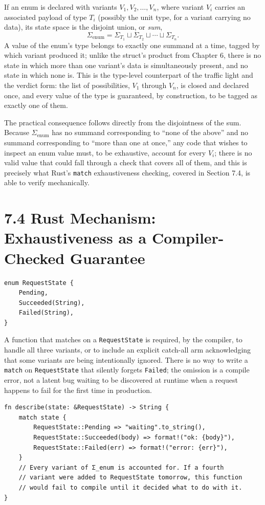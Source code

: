\documentclass[11pt]{book}
\begin{document}
If an enum is declared with variants $V_1, V_2, \ldots, V_n$, where variant $V_i$ carries an associated payload of type $T_i$ (possibly the unit type, for a variant carrying no data), its state space is the disjoint union, or \emph{sum},
\[
\Sigma_{\text{enum}} = \Sigma_{T_1} \sqcup \Sigma_{T_2} \sqcup \cdots \sqcup \Sigma_{T_n}.
\]
A value of the enum's type belongs to exactly one summand at a time, tagged by which variant produced it; unlike the struct's product from Chapter 6, there is no state in which more than one variant's data is simultaneously present, and no state in which none is. This is the type-level counterpart of the traffic light and the verdict form: the list of possibilities, $V_1$ through $V_n$, is closed and declared once, and every value of the type is guaranteed, by construction, to be tagged as exactly one of them.

The practical consequence follows directly from the disjointness of the sum. Because $\Sigma_{\text{enum}}$ has no summand corresponding to ``none of the above'' and no summand corresponding to ``more than one at once,'' any code that wishes to inspect an enum value must, to be exhaustive, account for every $V_i$; there is no valid value that could fall through a check that covers all of them, and this is precisely what Rust's \texttt{match} exhaustiveness checking, covered in Section 7.4, is able to verify mechanically.

\section*{7.4 Rust Mechanism: Exhaustiveness as a Compiler-Checked Guarantee}

\begin{lstlisting}
enum RequestState {
    Pending,
    Succeeded(String),
    Failed(String),
}
\end{lstlisting}

A function that matches on a \texttt{RequestState} is required, by the compiler, to handle all three variants, or to include an explicit catch-all arm acknowledging that some variants are being intentionally ignored. There is no way to write a \texttt{match} on \texttt{RequestState} that silently forgets \texttt{Failed}; the omission is a compile error, not a latent bug waiting to be discovered at runtime when a request happens to fail for the first time in production.

\begin{lstlisting}
fn describe(state: &RequestState) -> String {
    match state {
        RequestState::Pending => "waiting".to_string(),
        RequestState::Succeeded(body) => format!("ok: {body}"),
        RequestState::Failed(err) => format!("error: {err}"),
    }
    // Every variant of Σ_enum is accounted for. If a fourth
    // variant were added to RequestState tomorrow, this function
    // would fail to compile until it decided what to do with it.
}
\end{lstlisting}
\end{document}
